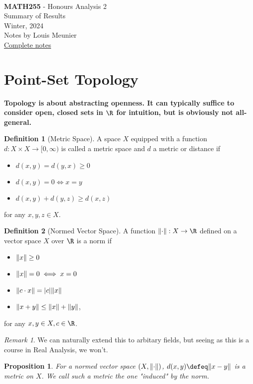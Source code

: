 \documentclass[12pt, oneside]{article}
\newcommand{\pageauthor}{Louis Meunier}
\newcommand{\pagetitle}{Honours Analysis 2}
\newcommand{\pagesubtitle}{MATH255}
\newcommand{\pagedescription}{Summary of Results}
\newcommand{\pagesemester}{Winter, 2024 }
\newcommand{\thetitle}{
  \noindent
  \vspace*{5em}\\
  {\Large\textbf{\pagesubtitle} - \pagetitle}\\
  {\small{\pagedescription}}
  \vspace*{2em}\\
  {\small \pagesemester\\
  Notes by \pageauthor}\\
  {\small \href{https://notes.louismeunier.net/Analysis 2/analysis2.pdf}{Complete notes}}
}
\theoremstyle{definition}
\newtheorem{defn}{Definition}
\theoremstyle{plain}
\newtheorem{prop}{Proposition}
\theoremstyle{remark}
\newtheorem{remark}{Remark}
\let\origsection=\section
\renewcommand\section[1]{\origsection{#1}\label{sec:\thesection}}
\begin{document}
\thetitle
\tableofcontents
{}

\section{Point-Set Topology}

\textbf{Topology is about abstracting openness. It can typically suffice to consider open, closed sets in $\R$ for intuition, but is obviously not all-general.}

\begin{defn}[Metric Space]
  A space $X$ equipped with a function $d : X \times X \to [0, \infty)$ is called a metric space and $d$ a metric or distance if \begin{itemize}
    \item $d(x, y) = d(y, x) \geq 0$
    \item $d(x, y) = 0 \iff x = y$
    \item $d(x, y) + d(y, z) \geq d(x, z)$
  \end{itemize}
  for any $x, y, z \in X$.
\end{defn}

\begin{defn}[Normed Vector Space]
  A function $\norm{\cdot} : X \to \R$ defined on a vector space $X$ over $\R$ is a norm if \begin{itemize}
    \item $\norm{x} \geq 0$
    \item $\norm{x} = 0 \iff x = 0$
    \item $\norm{c \cdot x} = \abs{c} \norm{x}$
    \item $\norm{x + y} \leq \norm{x} + \norm{y}$,
  \end{itemize}
  for any $x, y \in X, c \in \R$.
\end{defn}

\begin{remark}
  We can naturally extend this to arbitary fields, but seeing as this is a course in Real Analysis, we won't.
\end{remark}

\begin{prop}
  For a normed vector space $(X, \norm{\cdot})$, $d(x, y) \defeq \norm{x - y}$ is a metric on $X$. We call such a metric the one "induced" by the norm.
\end{prop}
\end{document}

